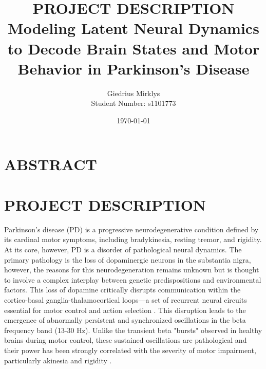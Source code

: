 \documentclass[12pt, a4paper]{article}
\begin{document}
\title{\textbf{PROJECT DESCRIPTION} \\ \vspace{1.5em} \large Modeling Latent Neural Dynamics to Decode Brain States and Motor Behavior in Parkinson’s Disease}
\author{Giedrius Mirklys \\
        \normalsize{Student Number: s1101773}}
\date{\today} %

\maketitle
\RaggedRight


\section{ABSTRACT}

\section{PROJECT DESCRIPTION}

Parkinson's disease (PD) is a progressive neurodegenerative condition defined by its cardinal motor symptoms, including bradykinesia, resting tremor, and rigidity. At its core, however, PD is a disorder of pathological neural dynamics. The primary pathology is the loss of dopaminergic neurons in the substantia nigra, however, the reasons for this neurodegeneration remains unknown but is thought to involve a complex interplay between genetic predispositions and environmental factors\parencite{kaliaParkinsonsDisease2015}. This loss of dopamine critically disrupts communication within the cortico-basal ganglia-thalamocortical loops---a set of recurrent neural circuits essential for motor control and action selection \parencite{alexanderFunctionalArchitectureBasal1990}. This disruption leads to the emergence of abnormally persistent and synchronized oscillations in the beta frequency band (13-30 Hz). Unlike the transient beta "bursts" observed in healthy brains during motor control, these sustained oscillations are pathological and their power has been strongly correlated with the severity of motor impairment, particularly akinesia and rigidity \parencite{brownDopamineDependencyOscillations2001,tinkhauserBetaBurstDynamics2017}.
\end{document}
